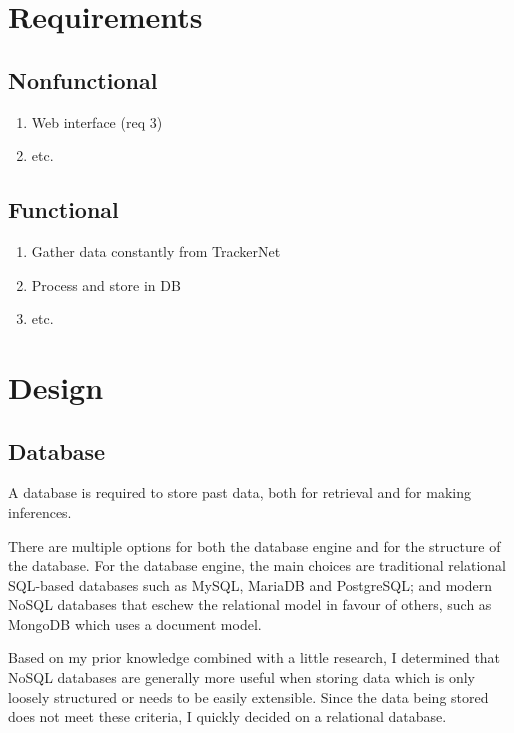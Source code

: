 \documentclass[a4paper,12pt]{article}
\begin{document}
\section{Requirements}

\subsection{Nonfunctional}

\begin{enumerate}
  \item Web interface (req 3)
  \item etc.
\end{enumerate}

\subsection{Functional}

\begin{enumerate}
  \item Gather data constantly from TrackerNet
  \item Process and store in DB
  \item etc.
\end{enumerate}

\section{Design}

\subsection{Database}

A database is required to store past data, both for retrieval and for making
inferences.

There are multiple options for both the database engine and for the structure
of the database. For the database engine, the main choices are traditional
relational SQL-based databases such as MySQL, MariaDB and PostgreSQL; and
modern NoSQL databases that eschew the relational model in favour of others,
such as MongoDB which uses a document model.

Based on my prior knowledge combined with a little research, I determined that
NoSQL databases are generally more useful when storing data which is only
loosely structured or needs to be easily extensible. Since the data being
stored does not meet these criteria, I quickly decided on a relational
database.
\end{document}
